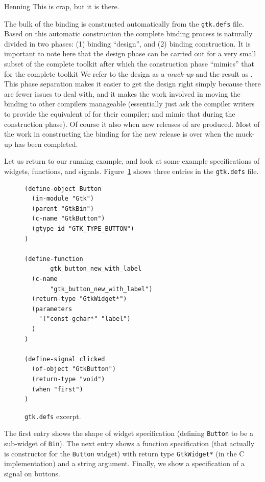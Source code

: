 \documentclass[workingdraft,endnotes]{usetex-v1}
\begin{document}
\begin{ednote}{Henning} This is crap, but it is there. \end{ednote}

The bulk of the \mgtk binding is constructed automatically from the
\texttt{gtk.defs} file. Based on this automatic construction the
complete binding process is naturally divided in two phases: (1)
binding ``design'', and (2) binding construction. It is important to
note here that the design phase can be carried out for a very small
subset of the complete toolkit after which the construction phase
``mimics'' that for the complete toolkit We refer to the design as a
\emph{muck-up} and the result as \minimgtk. This phase separation
makes it easier to get the design right simply because there are fewer
issues to deal with, and it makes the work involved in moving the
binding to other \sml compilers manageable (essentially just ask the
compiler writers to provide the equivalent of \minimgtk for their
compiler; and mimic that during the construction phase). Of course it
also when new releases of \gtk are produced. Most of the work in
constructing the binding for the new release is over when the muck-up
has been completed.

Let us return to our running example, and look at some example
specifications of widgets, functions, and signals. Figure~\ref{fig:gtk-defs}
shows three entries in the \texttt{gtk.defs} file.
\begin{figure}[htbp]
\begin{centering}
\begin{verbatim}
(define-object Button
  (in-module "Gtk")
  (parent "GtkBin")
  (c-name "GtkButton")
  (gtype-id "GTK_TYPE_BUTTON")
)

(define-function 
       gtk_button_new_with_label
  (c-name 
       "gtk_button_new_with_label")
  (return-type "GtkWidget*")
  (parameters
    '("const-gchar*" "label")
  )
)

(define-signal clicked
  (of-object "GtkButton")
  (return-type "void")
  (when "first")
)
\end{verbatim}
\caption{\texttt{gtk.defs} excerpt.\label{fig:gtk-defs}}
\end{centering}
\end{figure}
The first entry shows the shape of widget specification (defining
\texttt{Button} to be a sub-widget of \texttt{Bin}). The next entry
shows a function specification (that actually is constructor for the
\texttt{Button} widget) with return type \texttt{GtkWidget*} (in the C
implementation) and a string argument. Finally, we show a specification
of a signal on buttons.
\end{document}
